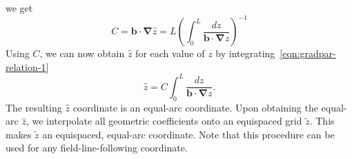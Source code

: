 \documentclass{jpp}
\begin{document}
we get
\begin{equation}
    C = \boldsymbol{b}\cdot\boldsymbol{\nabla} \hat{z} = L \left(\int_{0}^{L} \frac{dz}{\boldsymbol{b}\cdot \boldsymbol{\nabla}z}\right)^{-1}
\end{equation}
Using $C$, we can now obtain $\hat{z}$ for each value of $z$ by integrating~\eqref{eqn:gradpar-relation-1}
\begin{equation}
    \hat{z} =  C \int_{0}^{L}\frac{dz}{\boldsymbol{b}\cdot \boldsymbol{\nabla}z}. 
\label{eq:gradpar-relation-2}
    \end{equation}
The resulting $\hat{z}$ coordinate is an equal-arc coordinate. Upon obtaining the equal-arc $\hat{z}$, we interpolate all geometric coefficients onto an equispaced grid $\tilde{z}$. This makes $\tilde{z}$ an equispaced, equal-arc coordinate. Note that this procedure can be used for any field-line-following coordinate. 


\end{document}
